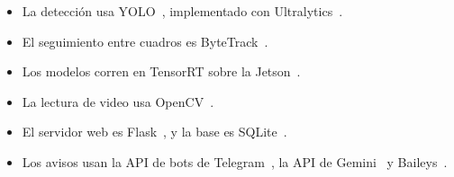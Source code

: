 \begin{itemize}
  \item La detección usa YOLO~\cite{redmon2016yolo}, implementado con
        Ultralytics~\cite{ultralytics}.
  \item El seguimiento entre cuadros es ByteTrack~\cite{zhang2022bytetrack}.
  \item Los modelos corren en TensorRT sobre la Jetson~\cite{tensorrt,jetson}.
  \item La lectura de video usa OpenCV~\cite{opencv}.
  \item El servidor web es Flask~\cite{flask}, y la base es
        SQLite~\cite{sqlite}.
  \item Los avisos usan la API de bots de Telegram~\cite{telegram},
        la API de Gemini~\cite{gemini} y Baileys~\cite{baileys}.
\end{itemize}
